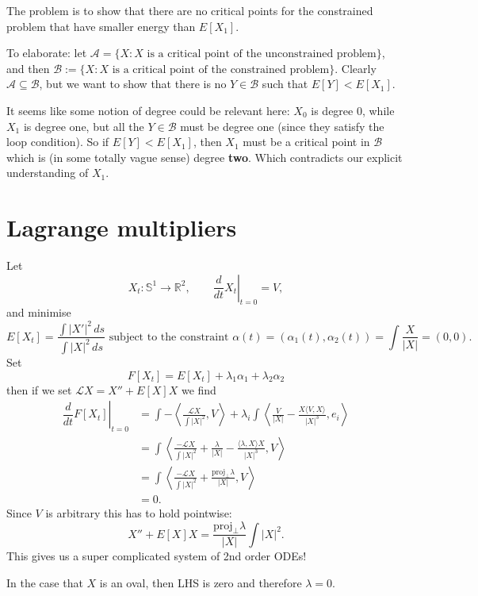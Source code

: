 \documentclass[12pt, a4paper]{amsart}
\theoremstyle{remark}
\newcommand{\R}{\mathbb{R}}
\newcommand{\So}{\mathbb{S}^1}
\begin{document}
The problem is to show that there are no critical points for the constrained problem that have smaller energy than $E[X_1]$.

To elaborate:   let $\mathcal{A}=\lbrace X:   X \text{ is a critical point of the unconstrained problem} \rbrace$, and then $\mathcal{B}:= \lbrace X:   X \text{ is a critical point of the constrained problem} \rbrace$.    Clearly $\mathcal{A}\subseteq\mathcal {B}$, but we want to show that there is no $Y\in \mathcal{B}$ such that $E[Y]<E[X_1]$.   

It seems like some notion of degree could be relevant here:  $X_0$ is degree $0$, while $X_1$ is degree one, but all the $Y\in \mathcal{B}$ must be degree one (since they satisfy the loop condition).   So if $E[Y]<E[X_1]$, then $X_1$ must be a critical point in $\mathcal{B}$ which is (in some totally vague sense) degree \textbf{two}.     Which contradicts our explicit understanding of $X_1$.
\bigskip


\section*{Lagrange multipliers}

Let 
$$X_t:\So\to \R^2, \quad\quad \left.\frac{d}{dt}X_t\right|_{t=0}=V,$$
and minimise
$$E[X_t]=  \frac{\int |X'|^2\,ds}{\int|X|^2\,ds } \text{ subject to  the constraint } \alpha(t)=(\alpha_1(t),\alpha_2(t))=\int  \frac{X}{|X|} =(0,0).$$
Set 
$$F[X_t]=E[X_t]+\lambda_1\alpha_1+\lambda_2\alpha_2$$
then if we set $\mathcal{L}X=X''+E[X]X$ we find
\begin{align*}
\left.\dfrac{d}{dt}F[X_t]\right|_{t=0}
&= \int -\left \langle \frac{\mathcal{L}X}{\int|X|^2}, V\right\rangle + \lambda_i\int \left\langle \frac{V}{|X|}-\frac{X\langle V,X\rangle}{|X|^3} ,e_i\right\rangle \\
&=\int \left\langle     \frac{-\mathcal{L}X}{\int|X|^2} + \frac{\lambda}{|X|}-\frac{\langle \lambda,X\rangle X}{|X|^3}, V\right\rangle \\
&= \int \left\langle   \frac{-\mathcal{L}X}{\int|X|^2} +\frac{\text{proj}_\perp \lambda}{|X|}, V\right\rangle\\
&= 0.
\end{align*}
Since $V$ is arbitrary this has to hold pointwise:  
$$X''+E[X] X=\frac{\text{proj}_\perp \lambda}{|X|}\int |X|^2.$$
This gives us a super complicated system of 2nd order ODEs!  

In the case that $X$ is an oval, then LHS is zero and therefore $\lambda=0$.  
\end{document}
